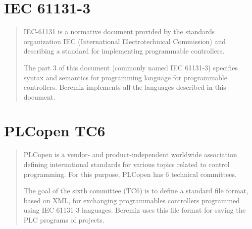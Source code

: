 \documentclass[letterpaper,10pt,english]{sphinxmanual}
\begin{document}
\chapter{IEC 61131-3}
\label{\detokenize{standards:iec-61131-3}}\label{\detokenize{standards::doc}}\begin{quote}

IEC-61131 is a normative document provided by the standards organization IEC
(International Electrotechnical Commission) and describing a standard for
implementing programmable controllers.

The part 3 of this document (commonly named IEC 61131-3) specifies syntax and
semantics for programming language for programmable controllers. Beremiz
implements all the languages described in this document.

\end{quote}


\chapter{PLCopen TC6}
\label{\detokenize{standards:plcopen-tc6}}\begin{quote}

PLCopen is a vendor- and product-independent worldwide association defining
international standards for various topics related to control programming.
For this purpose, PLCopen has 6 technical committees.

The goal of the sixth committee (TC6) is to define a standard file format,
based on XML, for exchanging programmables controllers programmed using
IEC 61131-3 languages. Beremiz uses this file format for saving the PLC
programs of projects.

\end{quote}



\renewcommand{\indexname}{Index}
\printindex
\end{document}
